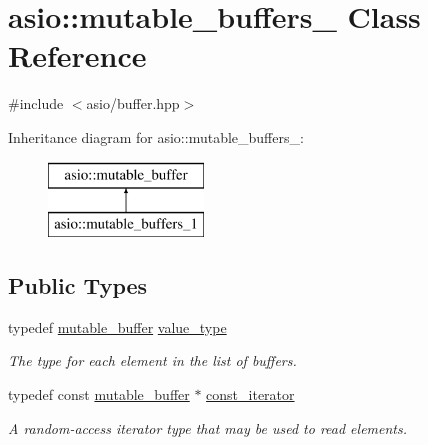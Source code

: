 \hypertarget{classasio_1_1mutable__buffers__1}{}\section{asio\+:\+:mutable\+\_\+buffers\+\_ Class Reference}
\label{classasio_1_1mutable__buffers__1}


{\ttfamily \#include $<$asio/buffer.\+hpp$>$}

Inheritance diagram for asio\+:\+:mutable\+\_\+buffers\+\_\+:\begin{figure}[H]
\begin{center}
\leavevmode
\includegraphics[height=2.000000cm]{classasio_1_1mutable__buffers__1}
\end{center}
\end{figure}
\subsection*{Public Types}
\begin{DoxyCompactItemize}
\item 
typedef \hyperlink{classasio_1_1mutable__buffer}{mutable\+\_\+buffer} \hyperlink{classasio_1_1mutable__buffers__1_ad0f0d91dda82c809af784aaedafc4890}{value\+\_\+type}
\begin{DoxyCompactList}\small\item\em The type for each element in the list of buffers. \end{DoxyCompactList}\item 
typedef const \hyperlink{classasio_1_1mutable__buffer}{mutable\+\_\+buffer} $\ast$ \hyperlink{classasio_1_1mutable__buffers__1_a50acb7cfb33b2e076062b79930452b51}{const\+\_\+iterator}
\begin{DoxyCompactList}\small\item\em A random-\/access iterator type that may be used to read elements. \end{DoxyCompactList}\end{DoxyCompactItemize}
